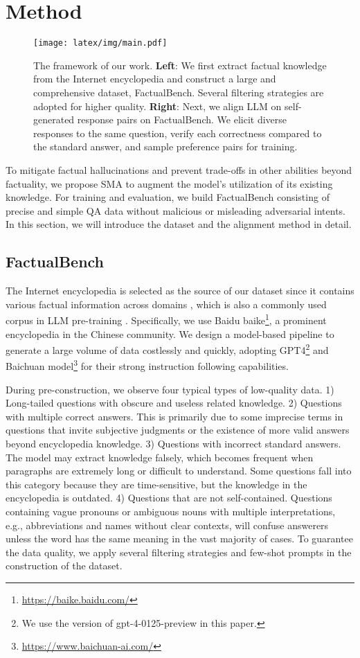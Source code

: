 \section{Method}
\begin{figure*}[t]
  \texttt{[image: latex/img/main.pdf]}
  \caption{The framework of our work. \textbf{Left}: We first extract factual knowledge from the Internet encyclopedia and construct a large and comprehensive dataset, FactualBench. Several filtering strategies are adopted for higher quality. \textbf{Right}: Next, we align LLM on self-generated response pairs on FactualBench. We elicit diverse responses to the same question, verify each correctness compared to the standard answer, and sample preference pairs for training.}
  \label{fig:main}
\end{figure*}

To mitigate factual hallucinations and prevent trade-offs in other abilities beyond factuality, we propose SMA to augment the model's utilization of its existing knowledge. For training and evaluation, we build FactualBench consisting of precise and simple QA data without malicious or misleading adversarial intents. In this section, we will introduce the dataset and the alignment method in detail.

\subsection{FactualBench}
The Internet encyclopedia is selected as the source of our dataset since it contains various factual information across domains \citep{wang2023survey, bai2024coig}, which is also a commonly used corpus in LLM pre-training \citep{liu2024datasets, ando2024wikisqe}. Specifically, we use Baidu baike\footnote{\url{https://baike.baidu.com/}}, a prominent encyclopedia in the Chinese community. We design a model-based pipeline to generate a large volume of data costlessly and quickly, adopting GPT4\footnote{We use the version of gpt-4-0125-preview in this paper.} \citep{achiam2023gpt} and Baichuan model\footnote{\url{https://www.baichuan-ai.com/}} for their strong instruction following capabilities. 

During pre-construction, we observe four typical types of low-quality data. 1) Long-tailed questions with obscure and useless related knowledge. 2) Questions with multiple correct answers. This is primarily due to some imprecise terms in questions that invite subjective judgments or the existence of more valid answers beyond encyclopedia knowledge. 3) Questions with incorrect standard answers. The model may extract knowledge falsely, which becomes frequent when paragraphs are extremely long or difficult to understand. Some questions fall into this category because they are time-sensitive, but the knowledge in the encyclopedia is outdated. 4) Questions that are not self-contained. Questions containing vague pronouns or ambiguous nouns with multiple interpretations, e.g., abbreviations and names without clear contexts, will confuse answerers unless the word has the same meaning in the vast majority of cases. To guarantee the data quality, we apply several filtering strategies and few-shot prompts in the construction of the dataset.

